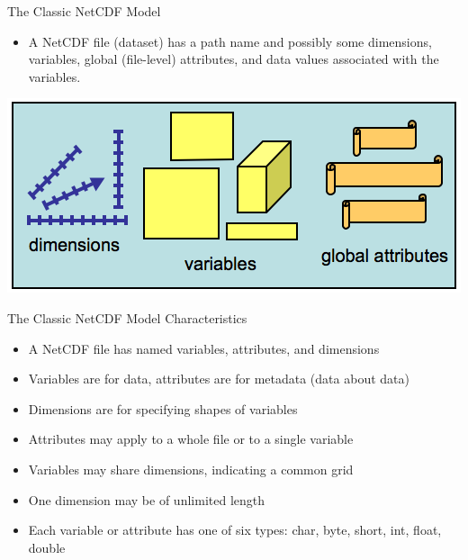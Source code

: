 \documentclass[compress,11pt,xcolor=svgnames,aspectratio=169]{beamer}
\begin{document}
\begin{frame}[t]{The Classic NetCDF Model}

\begin{itemize}

\item A NetCDF file (dataset) has a path name and possibly some dimensions, variables, global (file-level) attributes, and data values associated with the variables.

\end{itemize}

\begin{center}
\includegraphics[scale=0.6]{fig/netcdf-classic}
\end{center}

\nocite{netcdf}

\end{frame}

\begin{frame}[t]{The Classic NetCDF Model Characteristics}

    \begin{itemize}
    \setlength\itemsep{0.4cm}
        \item A NetCDF file has named variables, attributes, and dimensions
        \item Variables are for data, attributes are for metadata (data about data)
        \item Dimensions are for specifying shapes of variables
        \item Attributes may apply to a whole file or to a single variable
        \item Variables may share dimensions, indicating a common grid
        \item One dimension may be of unlimited length
        \item Each variable or attribute has one of six types: char, byte, short, int, float, double
    \end{itemize}

\nocite{netcdf}

\end{frame}
\end{document}
